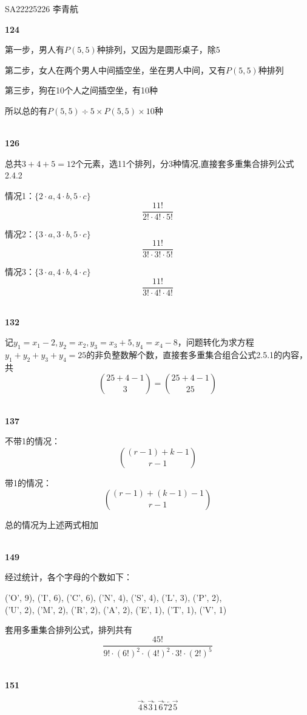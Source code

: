 \documentclass[UTF8]{ctexart}
\begin{document}
SA22225226 李青航

\noindent \textbf{124}

第一步，男人有$P(5,5)$种排列，又因为是圆形桌子，除5

第二步，女人在两个男人中间插空坐，坐在男人中间，又有$P(5,5)$种排列

第三步，狗在10个人之间插空坐，有10种

所以总的有$P(5,5)\div 5\times P(5,5) \times 10$种

~\\
\noindent \textbf{126}

总共$3+4+5=12$个元素，选11个排列，分3种情况,直接套多重集合排列公式2.4.2

情况1：$\{2\cdot a, 4\cdot b,5 \cdot c\}$\\
$$
\dfrac{11!}{2!\cdot 4!\cdot  5!}
$$

情况2：$\{3\cdot a,3\cdot b, 5\cdot c\}$
$$
\dfrac{11!}{3!\cdot 3!\cdot  5!}
$$

情况3：$\{3\cdot a,4\cdot b, 4\cdot c\}$
$$
\dfrac{11!}{3!\cdot 4!\cdot  4!}
$$

~\\
\noindent \textbf{132}

记$y_1 = x_1 - 2, y_2 = x_2, y_3 = x_3 + 5, y_4 = x_4 - 8$，问题转化为求方程$y_1 + y_2 +y_3 +y_4 = 25$的非负整数解个数，直接套多重集合组合公式2.5.1的内容，共
$$
{{25+4-1}\choose{3}}={{25+4-1}\choose {25}}
$$

~\\
\noindent \textbf{137}

不带1的情况：
$$
{(r-1)+k-1}\choose{r-1}
$$

带1的情况：
$$
{(r-1)+(k-1)-1}\choose{r-1}
$$

总的情况为上述两式相加

~\\
\noindent \textbf{149}

经过统计，各个字母的个数如下：\\
\begin{center}
\noindent('O', 9), ('I', 6), ('C', 6), ('N', 4), ('S', 4), ('L', 3), ('P', 2),\\
 ('U', 2), ('M', 2), ('R', 2), ('A', 2), ('E', 1), ('T', 1), ('V', 1)\\
\end{center}
套用多重集合排列公式，排列共有
$$
\dfrac{45!}{9!\cdot (6!)^2 \cdot (4!)^2\cdot 3! \cdot (2!)^5}
$$

~\\
\noindent \textbf{151}

$$
\overrightarrow{4}\overleftarrow 8\overrightarrow 3\overleftarrow 1 \overrightarrow 6\overleftarrow 7 \overleftarrow 2\overrightarrow 5
$$
\end{document}

